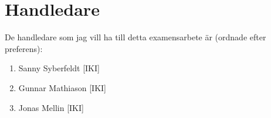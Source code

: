 \documentclass[12pt]{article}
\begin{document}
\newpage 

\section{Handledare}

De handledare som jag vill ha till detta examensarbete är (ordnade efter preferens):



\begin{enumerate}
	\item Sanny Syberfeldt [IKI]  
	\item Gunnar Mathiason [IKI]
	\item Jonas Mellin [IKI]
\end{enumerate}

\newpage



\end{document}
